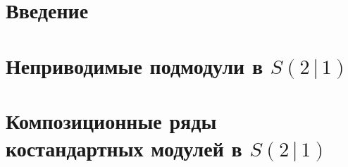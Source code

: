 \section*{Введение}
	

%	
%	

\section{Неприводимые подмодули в $S(2 \,|\, 1)$}
	
	
\newpage
\section{Композиционные ряды костандартных модулей в $S(2 \,|\, 1)$}
